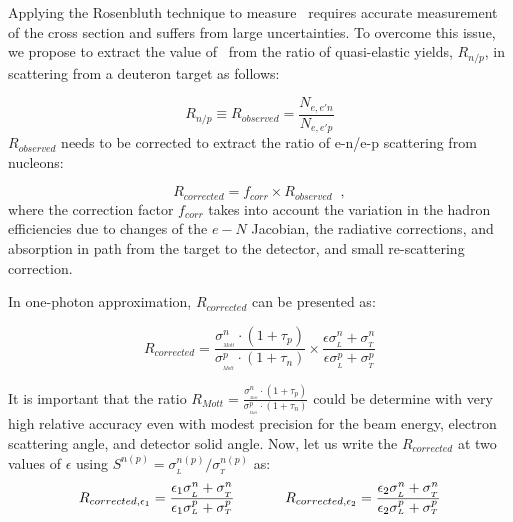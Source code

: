 Applying the Rosenbluth technique to measure \gen~requires accurate measurement of the cross section  and suffers from large uncertainties. 
To overcome this issue, we propose to extract the value of \gen~from the ratio of quasi-elastic yields, $R_{n/p}$, in scattering from a deuteron target as follows: 

\begin{equation}
R_{n/p} \equiv R_{observed} = \frac{N_{e,e'n}}{N_{e,e'p}}
\label{eq:1}
\end{equation}
$R_{observed}$ needs to be corrected to extract the ratio of e-n/e-p scattering from nucleons:

\begin{equation}
R_{corrected} = f_{corr} \times R_{observed} \;\; ,
\label{eq:2}
\end{equation}
where the correction factor $f_{corr}$ takes into account the variation in the hadron efficiencies due to changes of the $e-N$ Jacobian, the radiative corrections, and absorption in path
from the target to the detector, and small re-scattering correction.

In one-photon approximation, $R_{corrected}$ can be presented as: 

\begin{equation}
R_{corrected} = \frac {\sigma_{_{_{Mott}}}^n \cdot (1+\tau_p)}{\sigma_{_{_{Mott}}}^p \cdot (1+\tau_n)} \times \frac{\epsilon \sigma_{_L}^n + \sigma_{_T}^n}{\epsilon \sigma_{_L}^p + \sigma_{_T}^p}
\end{equation}

It is important that the ratio $R_{Mott} = \frac {\sigma_{_{_{Mott}}}^n \cdot (1+\tau_p)}{\sigma_{_{_{Mott}}}^p \cdot (1+\tau_n)}$ could be determine with very high relative accuracy even with modest precision for the beam energy, electron scattering angle, and detector solid angle. 
Now, let us write the $R_{corrected}$ at two values of $\epsilon$ using $S^{n(p)} = \sigma_{_L}^{n(p)}/ \sigma_{_T}^{n(p)}$ as:
\begin{equation*}
R_{{corrected},\epsilon_1} = \frac{\epsilon_1 \sigma_{_L}^n + \sigma_{_T}^n}{\epsilon_1 \sigma_{_L}^p + \sigma_{_T}^p}
\hskip .5 in
R_{{corrected},\epsilon_2} = \frac{\epsilon_2 \sigma_{_L}^n + \sigma_{_T}^n}{\epsilon_2 \sigma_{_L}^p + \sigma_{_T}^p}
\end{equation*}

